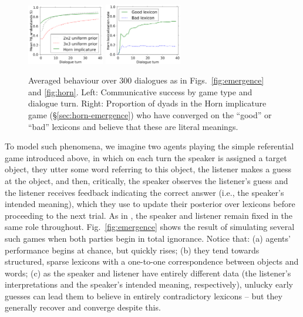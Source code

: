 \documentclass{article} %
\begin{document}
\begin{figure}
\centering
\includegraphics[width=0.3\textwidth]{figures/emergence-average.pdf}
\hspace{0.2in}
\includegraphics[width=0.3\textwidth]{figures/emergence-horn-average.pdf}
\caption{\label{fig:emergence-average} Averaged behaviour over 300 dialogues as in Figs.~\ref{fig:emergence} and \ref{fig:horn}. Left: Communicative success by game type and dialogue turn. Right: Proportion of dyads in the Horn implicature game (\S\ref{sec:horn-emergence}) who have converged on the ``good'' or ``bad'' lexicons and believe that these are literal meanings.}
\end{figure}

To model such phenomena, we imagine two agents playing the simple referential game introduced above, in which on each turn the speaker is assigned a target object, they utter some word referring to this object, the listener makes a guess at the object, and then, critically, the speaker observes the listener's guess and the listener receives feedback indicating the correct answer (i.e., the speaker's intended meaning), which they use to update their posterior over lexicons before proceeding to the next trial. As in \cite{krauss1964,clark1986}, the speaker and listener remain fixed in the same role throughout. Fig.~\ref{fig:emergence} shows the result of simulating several such games when both parties begin in total ignorance. Notice that: (a) agents' performance begins at chance, but quickly rises; (b) they tend towards structured, sparse lexicons with a one-to-one correspondence between objects and words; (c) as the speaker and listener have entirely different data (the listener's interpretations and the speaker's intended meaning, respectively), unlucky early guesses can lead them to believe in entirely contradictory lexicons -- but they generally recover and converge despite this.
\end{document}
